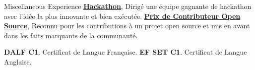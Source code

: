 \begin{rubric}{Miscellaneous Experience}
    \entry*[2023] \textbf{\href{https://github.com/hackathon-tom}{Hackathon}}, Dirigé une équipe gagnante de hackathon avec l'idée la plus innovante et bien exécutée.
    \entry*[2023] \textbf{\href{https://medusajs.com/blog/community-highlights-3/}{Prix de Contributeur Open Source}}, Reconnu pour les contributions à un projet open source et mis en avant dans les faits marquants de la communauté.

    \entry*[2024] \textbf{DALF C1}. Certificat de Langue Française.
    \entry*[2024] \textbf{EF SET C1}. Certificat de Langue Anglaise.
\end{rubric}